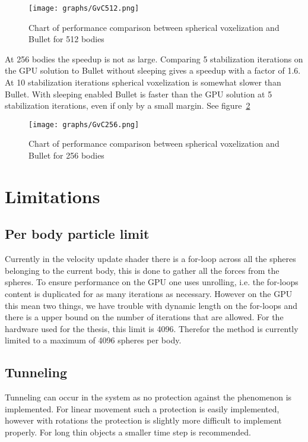 \begin{figure}[H]
  \centering
  \texttt{[image: graphs/GvC512.png]}
  \caption{Chart of performance comparison between spherical voxelization and Bullet for 512 bodies}
  \label{fig:GvC512}
\end{figure}

At 256 bodies the speedup is not as large. Comparing 5 stabilization iterations on the
GPU solution to Bullet without sleeping gives a speedup with a factor of 1.6.
At 10 stabilization iterations spherical voxelization is somewhat slower than Bullet.
With sleeping enabled Bullet is faster than the GPU solution at 5 stabilization iterations, even if
only by a small margin. See figure~\ref{fig:GvC256}

\begin{figure}[H]
  \centering
  \texttt{[image: graphs/GvC256.png]}
  \caption{Chart of performance comparison between spherical voxelization and Bullet for 256 bodies}
  \label{fig:GvC256}
\end{figure}

\section{Limitations}
\subsection{Per body particle limit}
Currently in the velocity update shader there is a for-loop across all the spheres
belonging to the current body, this is done to gather all the forces from the spheres.
To ensure performance on the GPU one uses unrolling, i.e. the for-loops content is
duplicated for as many iterations as necessary. However on the GPU this mean two
things, we have trouble with dynamic length on the for-loops and there is a upper
bound on the number of iterations that are allowed. For the hardware used for the thesis,
this limit is 4096. Therefor the method is currently limited to a maximum of 4096
spheres per body.

\subsection{Tunneling}
Tunneling can occur in the system as no protection against the phenomenon is implemented.
For linear movement such a protection is easily implemented, however with rotations
the protection is slightly more difficult to implement properly. For long thin
objects a smaller time step is recommended.
